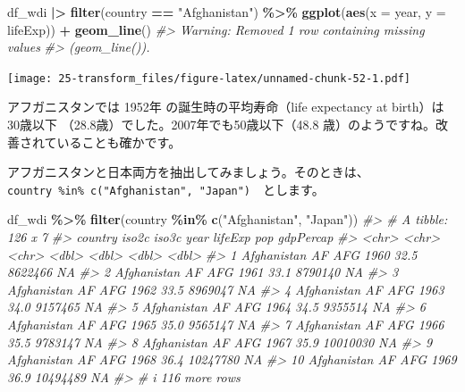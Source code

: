 \documentclass[
  xelatex, ja=standard]{bxjsbook}
\newenvironment{Shaded}{\begin{snugshade}}{\end{snugshade}}
\newcommand{\AttributeTok}[1]{\textcolor[rgb]{0.13,0.29,0.53}{#1}}
\newcommand{\CommentTok}[1]{\textcolor[rgb]{0.56,0.35,0.01}{\textit{#1}}}
\newcommand{\FunctionTok}[1]{\textcolor[rgb]{0.13,0.29,0.53}{\textbf{#1}}}
\newcommand{\NormalTok}[1]{#1}
\newcommand{\SpecialCharTok}[1]{\textcolor[rgb]{0.81,0.36,0.00}{\textbf{#1}}}
\newcommand{\StringTok}[1]{\textcolor[rgb]{0.31,0.60,0.02}{#1}}
\theoremstyle{definition}
\theoremstyle{definition}
\theoremstyle{definition}
\theoremstyle{definition}
\theoremstyle{remark}
\begin{document}
\begin{Shaded}
\begin{Highlighting}[]
\NormalTok{df\_wdi }\SpecialCharTok{|\textgreater{}} \FunctionTok{filter}\NormalTok{(country }\SpecialCharTok{==} \StringTok{"Afghanistan"}\NormalTok{) }\SpecialCharTok{\%\textgreater{}\%}
  \FunctionTok{ggplot}\NormalTok{(}\FunctionTok{aes}\NormalTok{(}\AttributeTok{x =}\NormalTok{ year, }\AttributeTok{y =}\NormalTok{ lifeExp)) }\SpecialCharTok{+} \FunctionTok{geom\_line}\NormalTok{()}
\CommentTok{\#\textgreater{} Warning: Removed 1 row containing missing values}
\CommentTok{\#\textgreater{} (\textasciigrave{}geom\_line()\textasciigrave{}).}
\end{Highlighting}
\end{Shaded}

\texttt{[image: 25-transform\_files/figure-latex/unnamed-chunk-52-1.pdf]}

アフガニスタンでは 1952年 の誕生時の平均寿命（life expectancy at birth）は　30歳以下 （28.8歳）でした。2007年でも50歳以下（48.8 歳）のようですね。改善されていることも確かです。

アフガニスタンと日本両方を抽出してみましょう。そのときは、 \texttt{country\ \%in\%\ c("Afghanistan",\ "Japan")}　とします。

\begin{Shaded}
\begin{Highlighting}[]
\NormalTok{df\_wdi }\SpecialCharTok{\%\textgreater{}\%} \FunctionTok{filter}\NormalTok{(country }\SpecialCharTok{\%in\%} \FunctionTok{c}\NormalTok{(}\StringTok{"Afghanistan"}\NormalTok{, }\StringTok{"Japan"}\NormalTok{))}
\CommentTok{\#\textgreater{} \# A tibble: 126 x 7}
\CommentTok{\#\textgreater{}    country     iso2c iso3c  year lifeExp      pop gdpPercap}
\CommentTok{\#\textgreater{}    \textless{}chr\textgreater{}       \textless{}chr\textgreater{} \textless{}chr\textgreater{} \textless{}dbl\textgreater{}   \textless{}dbl\textgreater{}    \textless{}dbl\textgreater{}     \textless{}dbl\textgreater{}}
\CommentTok{\#\textgreater{}  1 Afghanistan AF    AFG    1960    32.5  8622466        NA}
\CommentTok{\#\textgreater{}  2 Afghanistan AF    AFG    1961    33.1  8790140        NA}
\CommentTok{\#\textgreater{}  3 Afghanistan AF    AFG    1962    33.5  8969047        NA}
\CommentTok{\#\textgreater{}  4 Afghanistan AF    AFG    1963    34.0  9157465        NA}
\CommentTok{\#\textgreater{}  5 Afghanistan AF    AFG    1964    34.5  9355514        NA}
\CommentTok{\#\textgreater{}  6 Afghanistan AF    AFG    1965    35.0  9565147        NA}
\CommentTok{\#\textgreater{}  7 Afghanistan AF    AFG    1966    35.5  9783147        NA}
\CommentTok{\#\textgreater{}  8 Afghanistan AF    AFG    1967    35.9 10010030        NA}
\CommentTok{\#\textgreater{}  9 Afghanistan AF    AFG    1968    36.4 10247780        NA}
\CommentTok{\#\textgreater{} 10 Afghanistan AF    AFG    1969    36.9 10494489        NA}
\CommentTok{\#\textgreater{} \# i 116 more rows}
\end{Highlighting}
\end{Shaded}
\end{document}
